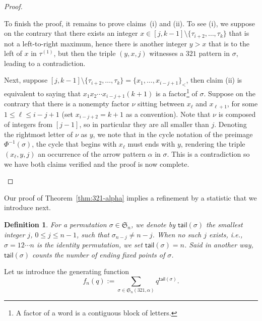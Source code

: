 \documentclass[12pt]{amsart}
\numberwithin{equation}{section}
\theoremstyle{plain}
\newtheorem{definition}[theorem]{Definition}
\def\fS{\mathfrak{S}}
\def\tail{\mathsf{tail}}
\begin{document}
\begin{proof}
\begin{enumerate}
	To finish the proof, it remains to prove claims~(i) and (ii). To see (i), we suppose on the contrary that there exists an integer $x\in [j,k-1]\setminus\{\tau_{i+2},\ldots,\tau_k\}$ that is not a left-to-right maximum, hence there is another integer $y>x$ that is to the left of $x$ in $\tau^{(1)}$, but then the triple $(y,x,j)$ witnesses a $321$ pattern in $\sigma$, leading to a contradiction. 

	Next, suppose $[j,k-1]\setminus\{\tau_{i+2},\ldots,\tau_k\}=\{x_1,\ldots,x_{i-j+1}\}_<$, then claim (ii) is equivalent to saying that $x_1x_2\cdots x_{i-j+1}(k+1)$ is a factor\footnote{A factor of a word is a contiguous block of letters.} of $\sigma$. Suppose on the contrary that there is a nonempty factor $\nu$ sitting between $x_{\ell}$ and $x_{\ell+1}$, for some $1\le \ell\le i-j+1$ (set $x_{i-j+2}=k+1$ as a convention). Note that $\nu$ is composed of integers from $[j-1]$, so in particular they are all smaller than $j$. Denoting the rightmost letter of $\nu$ as $y$, we note that in the cycle notation of the preimage $\Phi^{-1}(\sigma)$, the cycle that begins with $x_{\ell}$ must ends with $y$, rendering the triple $(x_{\ell},y,j)$ an occurrence of the arrow pattern $\alpha$ in $\sigma$. This is a contradiction so we have both claims verified and the proof is now complete.
\end{enumerate}
\end{proof}
	
Our proof of Theorem~\ref{thm:321-alpha} implies a refinement by a statistic that we introduce next.
	
\begin{definition}\label{def:q-Fibo}
	For a permutation $\sigma\in\fS_n$, we denote by $\tail(\sigma)$ the smallest integer $j$, $0\le j\le n-1$, such that $\sigma_{n-j}\neq n-j$. When no such $j$ exists, i.e., $\sigma=12\cdots n$ is the identity permutation, we set $\tail(\sigma)=n$. Said in another way, $\tail(\sigma)$ counts the number of ending fixed points of $\sigma$.
\end{definition}
	
	Let us introduce the generating function 
	$$f_n(q):=\sum_{\sigma\in \fS_n(321,\alpha)}q^{\tail(\sigma)}.$$
\end{document}
